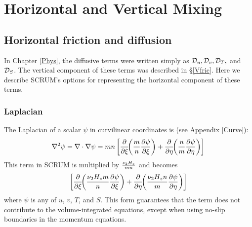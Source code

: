 \section{Horizontal and Vertical Mixing}

\subsection{Horizontal friction and diffusion}
\label{Smooth}

In Chapter \ref{Phys}, the diffusive terms were written simply as
${\cal D}_u, {\cal D}_v, {\cal D}_T,$ and ${\cal D}_S$.  The vertical
component of these terms was described in \S\ref{Vfric}.  Here we
describe SCRUM's options for representing the horizontal
component of these terms.

\subsubsection{Laplacian}
The Laplacian of a scalar $\psi$ in curvilinear coordinates is (see
Appendix \ref{Curve}):
\begin{equation}
   \nabla^2 \psi = \nabla \cdot \nabla \psi = mn \left[ 
   {\partial \over \partial \xi} \!\! \left( {m \over n} 
   {\partial \psi \over \partial \xi} \right) +
   {\partial \over \partial \eta} \!\! \left( {n \over m} 
   {\partial \psi \over \partial \eta} \right) \right]
\end{equation}
This term in SCRUM is multiplied by ${\nu_2 H_z \over mn}$ and becomes
\begin{equation}
   \left[ 
   {\partial \over \partial \xi} \!\! \left( {\nu_2 H_zm \over n} 
   {\partial \psi \over \partial \xi} \right) +
   {\partial \over \partial \eta} \!\! \left( {\nu_2 H_zn \over m} 
   {\partial \psi \over \partial \eta} \right) \right]
\end{equation}
where $\psi$ is any of $u$, $v$, $T$, and $S$.  This form guarantees
that the term does not contribute to the volume-integrated equations,
except when using no-slip boundaries in the momentum equations.

